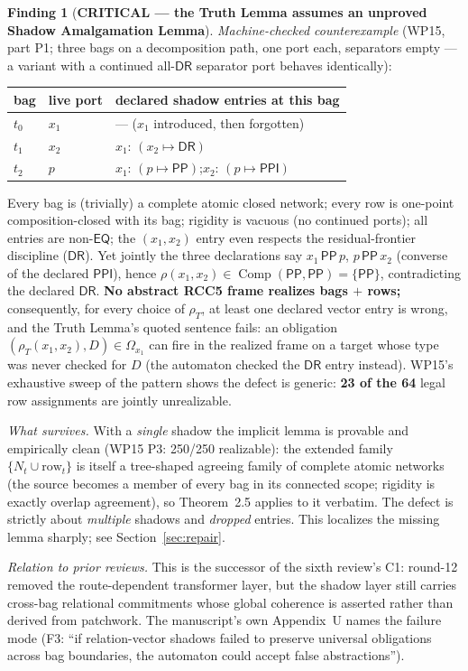 \documentclass[11pt]{article}
\theoremstyle{definition}
\newtheorem{finding}{Finding}
\newcommand{\EQ}{\mathsf{EQ}}
\newcommand{\PP}{\mathsf{PP}}
\newcommand{\PPI}{\mathsf{PPI}}
\newcommand{\DR}{\mathsf{DR}}
\newcommand{\Comp}{\operatorname{Comp}}
\begin{document}
\begin{finding}[\textbf{CRITICAL --- the Truth Lemma assumes an unproved
Shadow Amalgamation Lemma}]
\emph{Machine-checked counterexample} (WP15, part P1; three bags on a
decomposition path, one port each, separators empty --- a variant with a
continued all-$\DR$ separator port behaves identically):
\begin{center}
\begin{tabular}{lll}
\toprule
bag & live port & declared shadow entries at this bag\\
\midrule
$t_0$ & $x_1$ & --- ($x_1$ introduced, then forgotten)\\
$t_1$ & $x_2$ & $x_1$: $(x_2\mapsto\DR)$\\
$t_2$ & $p$   & $x_1$: $(p\mapsto\PP)$;\quad $x_2$: $(p\mapsto\PPI)$\\
\bottomrule
\end{tabular}
\end{center}
Every bag is (trivially) a complete atomic closed network; every row is
one-point composition-closed with its bag; rigidity is vacuous
(no continued ports); all entries are non-$\EQ$; the $(x_1,x_2)$ entry even
respects the residual-frontier discipline ($\DR$).  Yet jointly the three
declarations say $x_1\,\PP\,p$, $p\,\PP\,x_2$ (converse of the declared
$\PPI$), hence $\rho(x_1,x_2)\in\Comp(\PP,\PP)=\{\PP\}$, contradicting the
declared $\DR$.  \textbf{No abstract RCC5 frame realizes bags $+$ rows;}
consequently, for every choice of $\rho_T$, at least one declared vector
entry is wrong, and the Truth Lemma's quoted sentence fails: an obligation
$(\rho_T(x_1,x_2),D)\in\Omega_{x_1}$ can fire in the realized frame on a
target whose type was never checked for $D$ (the automaton checked the
$\DR$ entry instead).  WP15's exhaustive sweep of the pattern shows the
defect is generic: \textbf{23 of the 64} legal row assignments are jointly
unrealizable.

\emph{What survives.}  With a \emph{single} shadow the implicit lemma is
provable and empirically clean (WP15 P3: 250/250 realizable): the extended
family $\{N_t\cup\text{row}_t\}$ is itself a tree-shaped agreeing family of
complete atomic networks (the source becomes a member of every bag in its
connected scope; rigidity is exactly overlap agreement), so
Theorem~2.5 applies to it verbatim.  The defect is strictly about
\emph{multiple} shadows and \emph{dropped} entries.  This localizes the
missing lemma sharply; see Section~\ref{sec:repair}.

\emph{Relation to prior reviews.}  This is the successor of the sixth
review's C1: round-12 removed the route-dependent transformer layer, but
the shadow layer still carries cross-bag relational commitments whose
global coherence is asserted rather than derived from patchwork.  The
manuscript's own Appendix~U names the failure mode (F3: ``if relation-vector
shadows failed to preserve universal obligations across bag boundaries, the
automaton could accept false abstractions'').
\end{finding}
\end{document}
